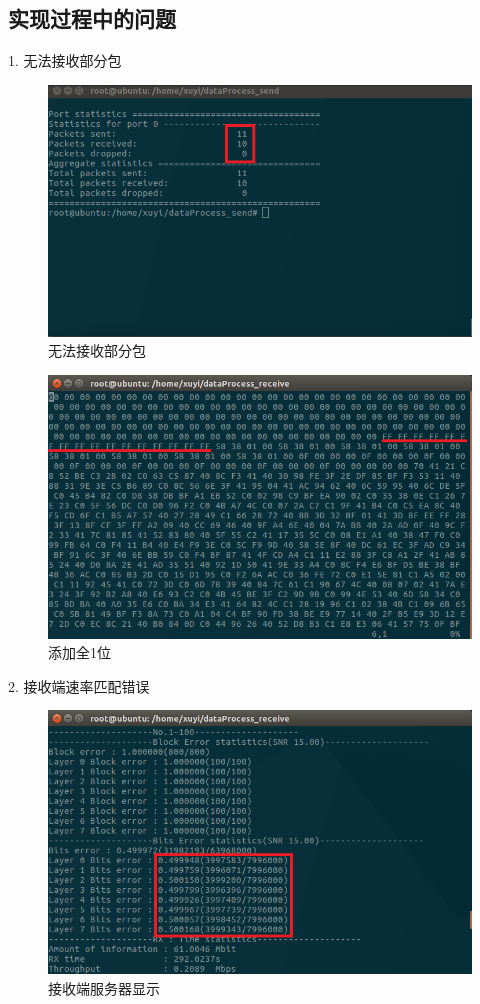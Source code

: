 \documentclass{article}
\begin{document}
\subsection{实现过程中的问题}
1. 无法接收部分包
\begin{figure}[H]
	\centering
	\includegraphics[width = .8\textwidth]{result_drop.png}
	\caption{无法接收部分包}
\end{figure}
\begin{figure}[H]
	\centering
	\includegraphics[width = .8\textwidth]{drop_fix.png}
	\caption{添加全1位}
\end{figure}
2. 接收端速率匹配错误
\begin{figure}[H]
	\centering
	\includegraphics[width = .8\textwidth]{receive_res_ber.png}
	\caption{接收端服务器显示}
\end{figure}
\end{document}
